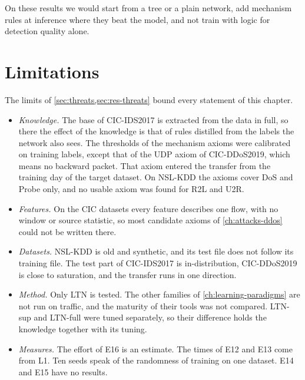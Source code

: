 On these results we would start from a tree or a plain network, add mechanism rules at inference
where they beat the model, and not train with logic for detection quality alone.

\section{Limitations}
\label{sec:conc-limitations}

The limits of \cref{sec:threats,sec:res-threats} bound every statement of this chapter.

\begin{itemize}
  \item \emph{Knowledge.} The base of CIC-IDS2017 is extracted from the data in full, so there the
    effect of the knowledge is that of rules distilled from the labels the network also sees. The
    thresholds of the mechanism axioms were calibrated on training labels, except that of the UDP
    axiom of CIC-DDoS2019, which means no backward packet. That axiom entered the transfer from the
    training day of the target dataset. On NSL-KDD the axioms cover DoS and Probe only, and no usable
    axiom was found for R2L and U2R.
  \item \emph{Features.} On the CIC datasets every feature describes one flow, with no window or
    source statistic, so most candidate axioms of \cref{ch:attacks-ddos} could not be written there.
  \item \emph{Datasets.} NSL-KDD is old and synthetic, and its test file does not follow its
    training file. The test part of CIC-IDS2017 is in-distribution, CIC-DDoS2019 is close to
    saturation, and the transfer runs in one direction.
  \item \emph{Method.} Only LTN is tested. The other families of \cref{ch:learning-paradigms} are not
    run on traffic, and the maturity of their tools was not compared. LTN-sup and LTN-full were tuned
    separately, so their difference holds the knowledge together with its tuning.
  \item \emph{Measures.} The effort of E16 is an estimate. The times of E12 and E13 come from
    L1. Ten seeds speak of the randomness of training on one dataset. E14 and E15 have no results.
\end{itemize}

